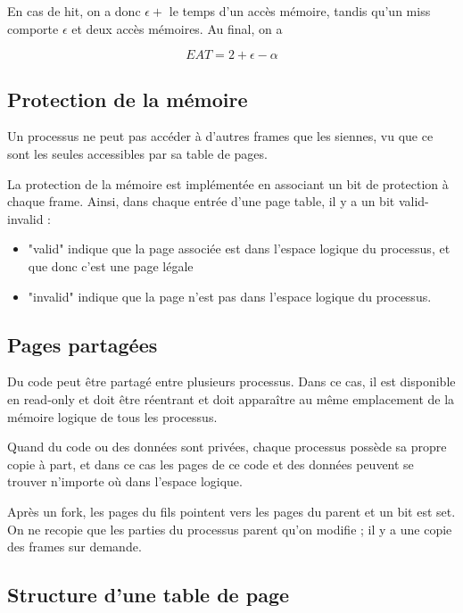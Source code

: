 	En cas de hit, on a donc $\epsilon +$ le temps d'un accès mémoire, tandis qu'un miss comporte $\epsilon$ et deux accès mémoires. Au final, on a
	
	$$EAT = 2 + \epsilon - \alpha$$
	
	\subsection{Protection de la mémoire}
	
	Un processus ne peut pas accéder à d'autres frames que les siennes, vu que ce sont les seules accessibles par sa table de pages.
	
	La protection de la mémoire est implémentée en associant un bit de protection à chaque frame. Ainsi, dans chaque entrée d'une page table, il y a un bit valid-invalid :
	
	\begin{itemize}
		\item "valid" indique que la page associée est dans l'espace logique du processus, et que donc c'est une page légale
		\item "invalid" indique que la page n'est pas dans l'espace logique du processus.
	\end{itemize}
	
	
	\subsection{Pages partagées}
	
	Du code peut être partagé entre plusieurs processus. Dans ce cas, il est disponible en read-only et doit être réentrant et doit apparaître au même emplacement de la mémoire logique de tous les processus.
	
	Quand du code ou des données sont privées, chaque processus possède sa propre copie à part, et dans ce cas les pages de ce code et des données peuvent se trouver n'importe où dans l'espace logique.
	
	Après un fork, les pages du fils pointent vers les pages du parent et un bit est set. On ne recopie que les parties du processus parent qu'on modifie ; il y a une copie des frames sur demande.
	
	
	\subsection{Structure d'une table de page}
	
